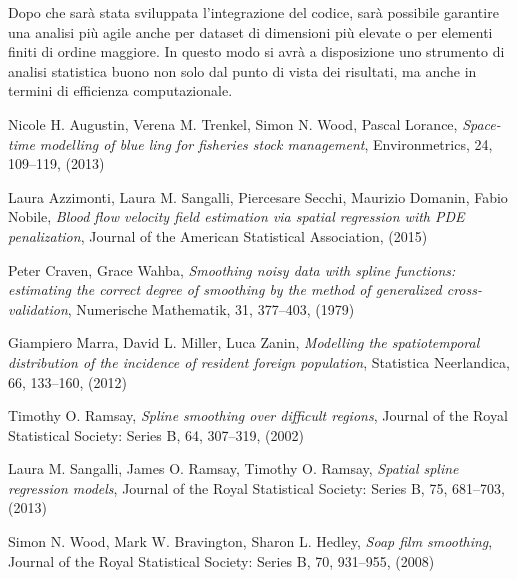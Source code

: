 \documentclass[a4paper,11pt,twoside,openright]{book}							%
\begin{document}
Dopo che sarà stata sviluppata l'integrazione del codice, sarà possibile garantire una analisi più agile anche per dataset di dimensioni più elevate o per elementi finiti di ordine maggiore. In questo modo si avrà a disposizione uno strumento di analisi statistica buono non solo dal punto di vista dei risultati, ma anche in termini di efficienza computazionale.


\begin{thebibliography}{9}

Nicole H. Augustin, Verena M. Trenkel, Simon N. Wood, Pascal Lorance, \emph{Space-time modelling of blue ling for fisheries stock management}, Environmetrics, 24, 109–119, (2013)

Laura Azzimonti, Laura M. Sangalli, Piercesare Secchi, Maurizio Domanin, Fabio Nobile, \emph{Blood flow velocity field estimation via spatial regression with PDE penalization}, Journal of the American Statistical Association, (2015)

Peter Craven, Grace Wahba, \emph{Smoothing noisy data with spline functions: estimating the correct degree of smoothing by the method of generalized cross-validation}, Numerische Mathematik, 31, 377–403, (1979)

Giampiero Marra, David L. Miller, Luca Zanin, \emph{Modelling the spatiotemporal distribution of the incidence of resident foreign population}, Statistica Neerlandica, 66, 133–160, (2012)

Timothy O. Ramsay, \emph{Spline smoothing over difficult regions}, Journal of the Royal Statistical Society: Series B, 64, 307–319, (2002)

Laura M. Sangalli, James O. Ramsay, Timothy O. Ramsay, \emph{Spatial spline regression models}, Journal of the Royal Statistical Society: Series B, 75, 681–703, (2013)

Simon N. Wood, Mark W. Bravington, Sharon L. Hedley, \emph{Soap film smoothing}, Journal of the Royal Statistical Society: Series B, 70, 931–955, (2008)



\end{thebibliography}
\end{document}
